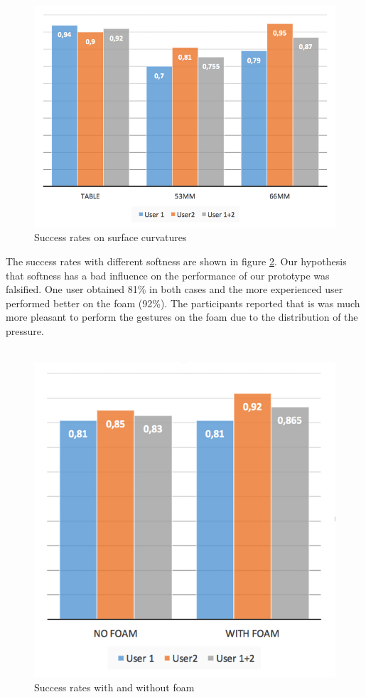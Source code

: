 \begin{figure}
\includegraphics[scale=0.35]{images/surface.jpg}
\caption{Success rates on surface curvatures}
\label{fig:surface}
\end{figure}
The success rates with different softness are shown in figure \ref{fig:foam}. Our hypothesis  that softness has a bad influence on the performance of our prototype was falsified. One user obtained 81\%  in both cases and the more experienced user performed better on the foam (92\%). The participants reported that is was much more pleasant to perform the gestures on the foam due to the distribution of the pressure. 
\\ \\
\begin{center}
\begin{figure}
\includegraphics[scale=0.5]{images/foam.jpg}
\caption{Success rates with and without foam}
\label{fig:foam}
\end{figure}
\end{center}
